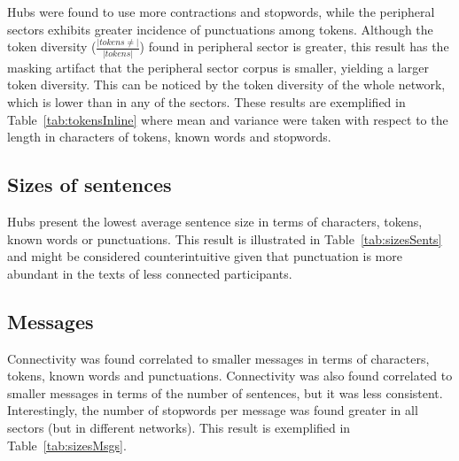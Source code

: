Hubs were found to use more contractions and stopwords, while the peripheral sectors exhibits greater incidence of punctuations among tokens.
Although the token diversity ($\frac{|tokens \neq|}{|tokens|}$) found in peripheral sector is greater,
this result has the masking artifact that the peripheral sector corpus is smaller, yielding a larger token diversity.
This can be noticed by the token diversity of the whole network, which is lower than in any of the sectors.
These results are exemplified in Table~\ref{tab:tokensInline}
where mean and variance were taken with respect to the length in characters of tokens, known words and stopwords.

\FloatBarrier



%

\subsection{Sizes of sentences}\label{subsec:ss}
Hubs present the lowest average sentence size
in terms of characters, tokens, known words or punctuations.
This result is illustrated in Table~\ref{tab:sizesSents}
and might be considered counterintuitive given that punctuation
is more abundant in the texts of less connected participants.

\FloatBarrier

\subsection{Messages}\label{subsec:mm}
Connectivity was found correlated to smaller messages in terms of characters, tokens, known words and punctuations.
Connectivity was also found correlated to smaller messages in terms of the number of sentences, but
it was less consistent.
Interestingly, the number of stopwords per message was found greater in all sectors (but in different networks).
This result is exemplified in Table~\ref{tab:sizesMsgs}.

\FloatBarrier


